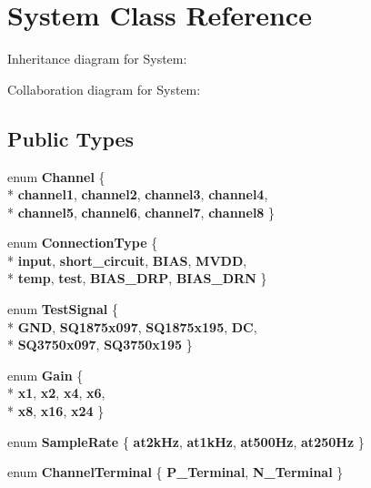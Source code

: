 \hypertarget{classSystem}{\section{System Class Reference}
\label{classSystem}
}


Inheritance diagram for System\+:


Collaboration diagram for System\+:
\subsection*{Public Types}
\begin{DoxyCompactItemize}
\item 
\hypertarget{classSystem_accbb532702c1994c649a41ba3e0b91c5}{enum {\bfseries Channel} \{ \\*
{\bfseries channel1}, 
{\bfseries channel2}, 
{\bfseries channel3}, 
{\bfseries channel4}, 
\\*
{\bfseries channel5}, 
{\bfseries channel6}, 
{\bfseries channel7}, 
{\bfseries channel8}
 \}}\label{classSystem_accbb532702c1994c649a41ba3e0b91c5}

\item 
\hypertarget{classSystem_af3382dec151558280d2d38b6a07f2c57}{enum {\bfseries Connection\+Type} \{ \\*
{\bfseries input}, 
{\bfseries short\+\_\+circuit}, 
{\bfseries B\+I\+A\+S}, 
{\bfseries M\+V\+D\+D}, 
\\*
{\bfseries temp}, 
{\bfseries test}, 
{\bfseries B\+I\+A\+S\+\_\+\+D\+R\+P}, 
{\bfseries B\+I\+A\+S\+\_\+\+D\+R\+N}
 \}}\label{classSystem_af3382dec151558280d2d38b6a07f2c57}

\item 
\hypertarget{classSystem_a5ad11f039305a0628b65a43ce5aa8f14}{enum {\bfseries Test\+Signal} \{ \\*
{\bfseries G\+N\+D}, 
{\bfseries S\+Q1875x097}, 
{\bfseries S\+Q1875x195}, 
{\bfseries D\+C}, 
\\*
{\bfseries S\+Q3750x097}, 
{\bfseries S\+Q3750x195}
 \}}\label{classSystem_a5ad11f039305a0628b65a43ce5aa8f14}

\item 
\hypertarget{classSystem_a198df846d1ea72a0e2407146f0650e87}{enum {\bfseries Gain} \{ \\*
{\bfseries x1}, 
{\bfseries x2}, 
{\bfseries x4}, 
{\bfseries x6}, 
\\*
{\bfseries x8}, 
{\bfseries x16}, 
{\bfseries x24}
 \}}\label{classSystem_a198df846d1ea72a0e2407146f0650e87}

\item 
\hypertarget{classSystem_a4bec9be96e7c64e4544b86b6467d002a}{enum {\bfseries Sample\+Rate} \{ {\bfseries at2k\+Hz}, 
{\bfseries at1k\+Hz}, 
{\bfseries at500\+Hz}, 
{\bfseries at250\+Hz}
 \}}\label{classSystem_a4bec9be96e7c64e4544b86b6467d002a}

\item 
\hypertarget{classSystem_a209625b11d630ae69c8f059551cab7f6}{enum {\bfseries Channel\+Terminal} \{ {\bfseries P\+\_\+\+Terminal}, 
{\bfseries N\+\_\+\+Terminal}
 \}}\label{classSystem_a209625b11d630ae69c8f059551cab7f6}

\end{DoxyCompactItemize}
